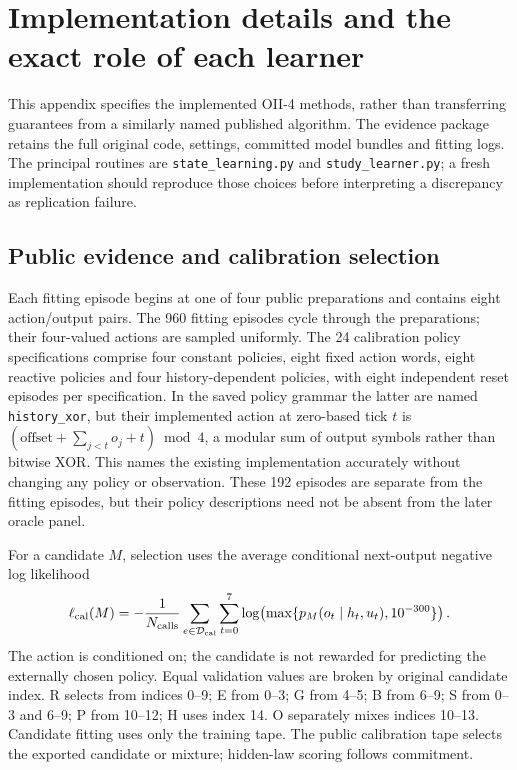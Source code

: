 \FloatBarrier
\appendix

\section{Implementation details and the exact role of each learner}\label{app:methods}
This appendix specifies the implemented OII-4 methods, rather than transferring guarantees from a similarly named published algorithm. The evidence package retains the full original code, settings, committed model bundles and fitting logs. The principal routines are \texttt{state\_learning.py} and \texttt{study\_learner.py}; a fresh implementation should reproduce those choices before interpreting a discrepancy as replication failure.

\subsection{Public evidence and calibration selection}
Each fitting episode begins at one of four public preparations and contains eight action/output pairs. The 960 fitting episodes cycle through the preparations; their four-valued actions are sampled uniformly. The 24 calibration policy specifications comprise four constant policies, eight fixed action words, eight reactive policies and four history-dependent policies, with eight independent reset episodes per specification. In the saved policy grammar the latter are named \texttt{history\_xor}, but their implemented action at zero-based tick $t$ is $(\text{offset}+\sum_{j<t}o_j+t)\bmod4$, a modular sum of output symbols rather than bitwise XOR. This names the existing implementation accurately without changing any policy or observation. These 192 episodes are separate from the fitting episodes, but their policy descriptions need not be absent from the later oracle panel.

For a candidate $M$, selection uses the average conditional next-output negative log likelihood
\begin{equation}\label{eq:nll}
 \ell_{\rm cal}(M)=-\frac{1}{N_{\rm calls}}
 \sum_{e\in\mathcal D_{\rm cal}}\sum_{t=0}^{7}
 \log\!\left(\max\{p_M(o_t\mid h_t,u_t),10^{-300}\}\right).
\end{equation}
The action is conditioned on; the candidate is not rewarded for predicting the externally chosen policy. Equal validation values are broken by original candidate index. R selects from indices 0--9; E from 0--3; G from 4--5; B from 6--9; S from 0--3 and 6--9; P from 10--12; H uses index 14. O separately mixes indices 10--13. Candidate fitting uses only the training tape. The public calibration tape selects the exported candidate or mixture; hidden-law scoring follows commitment.

